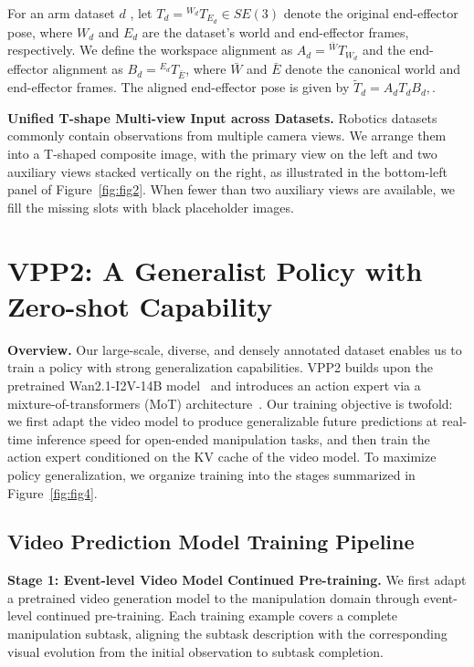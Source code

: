 For an arm dataset \(d\) , let
\(T_d = {}^{W_d}T_{E_d} \in SE(3)\) denote the original
end-effector pose, where \(W_d\) and \(E_d\) are the dataset's
world and end-effector frames, respectively.
We define the workspace alignment as
\(A_d = {}^{\bar{W}}T_{W_d}\) and the end-effector alignment as
\(B_d = {}^{E_d}T_{\bar{E}}\), where \(\bar{W}\) and \(\bar{E}\)
denote the canonical world and end-effector frames.
The aligned end-effector pose is given by $\widetilde{T}_d = A_d T_d B_d,
    \label{eq:coordinate_alignment}$.

\textbf{Unified T-shape Multi-view Input across Datasets.} 
Robotics datasets commonly contain observations from multiple camera views. We arrange them into a T-shaped composite image, with the primary view on the left and two auxiliary views stacked vertically on the right, as illustrated in the bottom-left panel of Figure~\ref{fig:fig2}. When fewer than two auxiliary views are available, we fill the missing slots with black placeholder images.

\section{VPP2: A Generalist Policy with Zero-shot Capability}

\textbf{Overview.}
Our large-scale, diverse, and densely annotated dataset enables us to train a policy with strong generalization capabilities. VPP2 builds upon the pretrained Wan2.1-I2V-14B model~\citep{wan2025wan} and introduces an action expert via a mixture-of-transformers (MoT) architecture~\citep{liang2025mixture}. Our training objective is twofold: we first adapt the video model to produce generalizable future predictions at real-time inference speed for open-ended manipulation tasks, and then train the action expert conditioned on the KV cache of the video model. To maximize policy generalization, we organize training into the stages summarized in Figure~\ref{fig:fig4}.

\subsection{Video Prediction Model Training Pipeline}

\textbf{Stage 1: Event-level Video Model Continued Pre-training.}
We first adapt a pretrained video generation model to the manipulation
domain through event-level continued pre-training.
Each training example covers a complete manipulation subtask, aligning
the subtask description with the corresponding visual evolution from
the initial observation to subtask completion.


